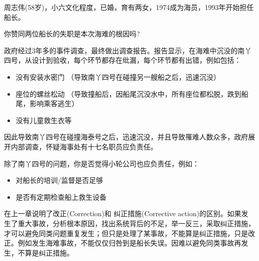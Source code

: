 周志伟(58岁)，小六文化程度，已婚，育有两女，1974成为海员，1993年开始担任船长。



你赞同两位船长的失职是本次海难的根因吗?

政府经过3年多的事件调查，最终做出调查报告。报告显示，在海难中沉没的南丫四号，从设计到验收，每个环节都存在纰漏，每个环节都有出错，例如包括：

\begin{itemize}
\tightlist
\item
  没有安装水密门 （导致南丫四号在碰撞另一艘船之后，迅速沉没）
\item
  座位的螺丝松动
  （导致撞船后，因船尾沉没水中，所有座位都松脱，跌到船尾，影响乘客逃生）
\item
  没有儿童救生衣等
\end{itemize}

因此导致南丫四号在碰撞海泰号之后，迅速沉没，并且导致罹难人数众多，政府展开内部调查，怀疑海事处有十七名职员应负责任。

除了南丫四号的问题，你是否觉得小轮公司也应负责任，例如：

\begin{itemize}
\tightlist
\item
  对船长的培训/监督是否足够
\item
  是否有定期检查船上救生设备
\end{itemize}

在上一章说明了改正(Correction)和 纠正措施(Corrective action)的区别。如果发生了重大事故，分析根本原因，找出系统背后的不足，举一反三，采取纠正措施，才可以避免同类问题重复发生；但只是处理了某事故，不能算是纠正措施，只是改正。例如发生海难事故，不能仅仅归咎到是船长失误。因难以避免同类事故再发生，不算是纠正措施。\\

